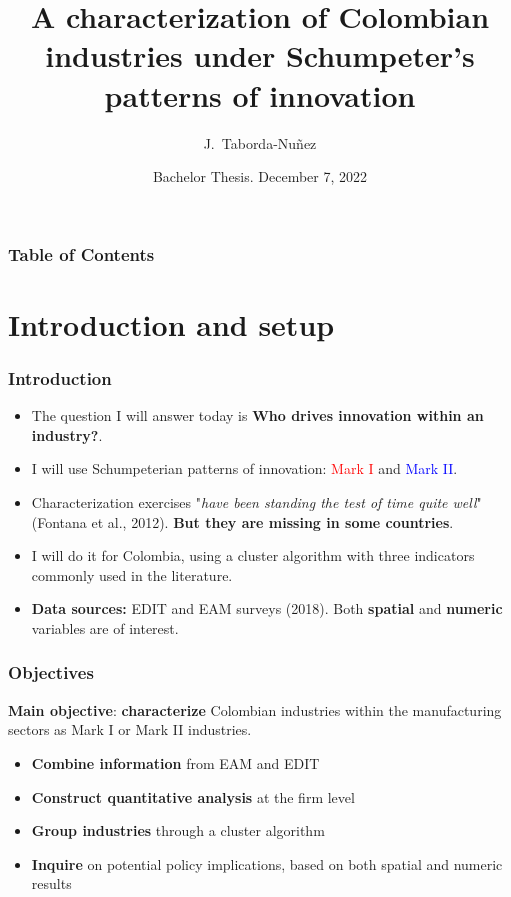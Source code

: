 \documentclass{beamer}
\begin{document}
	\title[J.S Industry Characterization]{
	\textbf{A characterization of Colombian industries under Schumpeter's patterns of innovation}
	}   
	\date[BA 2022-30]{Bachelor Thesis. December 7, 2022} 
	\author[Taborda-Nuñez]{J.~Taborda-Nuñez}
	\begin{frame} 
		\titlepage 
	\end{frame}  

	\begin{frame}
		\frametitle{Table of Contents}
		\tableofcontents
	\end{frame}


	\AtBeginSection[]
	{
		\begin{frame}
			\frametitle{Table of Contents}
			\tableofcontents[currentsection]
		\end{frame}
	}
	
\section{Introduction and setup}
	\begin{frame}[allowframebreaks]
		\frametitle{Introduction} 
		\begin{itemize}
			\item The question I will answer today is \textbf{Who drives innovation within an industry?}.
			\item I will use Schumpeterian patterns of innovation: \textcolor{red}{Mark I} and \textcolor{blue}{Mark II}.
			\item Characterization exercises "\textit{have been standing the test of time quite well}" (Fontana et al., 2012). \textbf{But they are missing in some countries}.
			\item I will do it for Colombia, using a cluster algorithm with three indicators commonly used in the literature.
			\item \textbf{Data sources:} EDIT and EAM surveys (2018). Both \textbf{spatial} and \textbf{numeric} variables are of interest.
		\end{itemize}
	\end{frame}	
	\begin{frame}
		\frametitle{Objectives}
		\textbf{Main objective}: \textbf{characterize} Colombian industries within the manufacturing sectors as Mark I or Mark II industries.
		\begin{itemize}
			\item \textbf{Combine information} from EAM and EDIT
			\item \textbf{Construct quantitative analysis} at the firm level
			\item \textbf{Group industries} through a cluster algorithm
			\item \textbf{Inquire} on potential policy implications, based on both spatial and numeric results
		\end{itemize}
	\end{frame}
\end{document}
